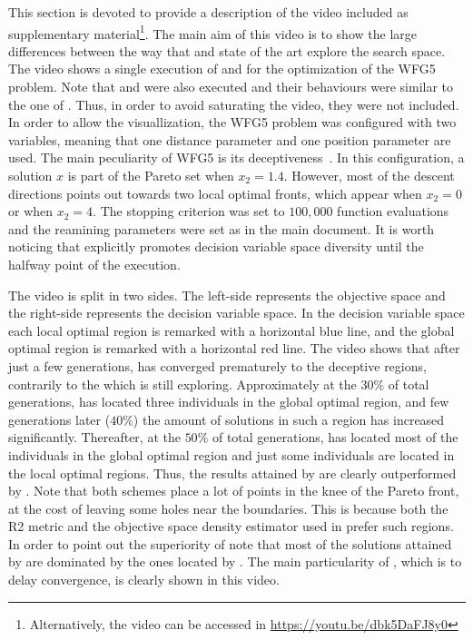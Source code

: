 This section is devoted to provide a description of the video included as supplementary material\footnote{Alternatively, the video can be accessed 
in \url{https://youtu.be/dbk5DaFJ8y0}}.
%
The main aim of this video is to show the large differences between the way that \VSDMOEA{} and state of the art \MOEAS{} 
explore the search space.
%
The video shows a single execution of \VSDMOEA{} and \RMOEA{} for the optimization of the WFG5 problem.
%
Note that \NSGAII{} and \MOEAD{} were also executed and their behaviours were similar to the one of \RMOEA{}.
%
Thus, in order to avoid saturating the video, they were not included.
%
In order to allow the visuallization, the WFG5 problem was configured with two variables, meaning that one distance parameter
and one position parameter are used.
%
The main peculiarity of WFG5 is its deceptiveness~\cite{Joel:WFG}.
%
In this configuration, a solution $x$ is part of the Pareto set when $x_2 = 1.4$.
%
However, most of the descent directions points out towards two local optimal fronts, which appear when $x_2 = 0$ or when $x_2 = 4$.
%
The stopping criterion was set to $100,000$ function evaluations and the reamining parameters were set as in the main document.
%
It is worth noticing that \VSDMOEA{} explicitly promotes decision variable space diversity until the halfway point of the execution.

The video is split in two sides.
%
The left-side represents the objective space and the right-side represents the decision variable space.
%
In the decision variable space each local optimal region is remarked with a horizontal blue line, and the global optimal region is remarked with a horizontal red line.
%
The video shows that after just a few generations, \RMOEA{} has converged prematurely to the deceptive regions, 
contrarily to the \VSDMOEA{} which is still exploring.
%
Approximately at the $30\%$ of total generations, \VSDMOEA{} has located three individuals in the global optimal region, and few generations later ($40\%$)
the amount of solutions in such a region has increased significantly.
%
Thereafter, at the $50\%$ of total generations, \VSDMOEA{} has located most of the individuals in the global optimal region and just 
some individuals are located in the local optimal regions.
%
Thus, the results attained by \RMOEA{} are clearly outperformed by \VSDMOEA{}.
%
Note that both schemes place a lot of points in the knee of the Pareto front, at the cost of leaving some holes near the boundaries.
%
This is because both the R2 metric and the objective space density estimator used in \VSDMOEA{} prefer such regions.
%
In order to point out the superiority of \VSDMOEA{} note that most of the solutions attained by \RMOEA{} are dominated by the ones 
located by \VSDMOEA{}.
%
The main particularity of \VSDMOEA{}, which is to delay convergence, is clearly shown in this video.

